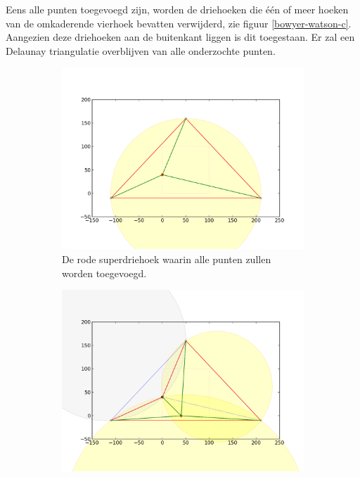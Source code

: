 Eens alle punten toegevoegd zijn, worden de driehoeken die één of meer hoeken van de omkaderende vierhoek bevatten verwijderd, zie figuur \ref{bowyer-watson-c}. Aangezien deze driehoeken aan de buitenkant liggen is dit toegestaan. Er zal een Delaunay triangulatie overblijven van alle onderzochte punten.

\begin{figure}
	\center
	\begin{subfigure}{0.4\textwidth}
		\includegraphics[width=\textwidth]{bowyer-watson_superdriehoek}
		\caption{De rode superdriehoek waarin alle punten zullen worden toegevoegd.}
		\label{bowyer-watson-a}
	\end{subfigure}
	\begin{subfigure}{0.4\textwidth}
		\includegraphics[width=\textwidth]{bowyer-watson_nieuwpunt}

\end{subfigure}
\end{figure}

